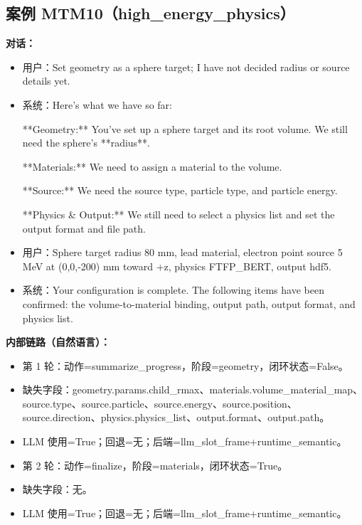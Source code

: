 \documentclass[11pt]{ctexart}
\begin{document}
\subsection{案例 MTM10（high\_energy\_physics）}
\textbf{对话：}
\begin{itemize}
\item 用户：Set geometry as a sphere target; I have not decided radius or source details yet.
\item 系统：Here's what we have so far:

**Geometry:** You've set up a sphere target and its root volume. We still need the sphere's **radius**.

**Materials:** We need to assign a material to the volume.

**Source:** We need the source type, particle type, and particle energy.

**Physics \& Output:** We still need to select a physics list and set the output format and file path.
\item 用户：Sphere target radius 80 mm, lead material, electron point source 5 MeV at (0,0,-200) mm toward +z, physics FTFP\_BERT, output hdf5.
\item 系统：Your configuration is complete. The following items have been confirmed: the volume-to-material binding, output path, output format, and physics list.
\end{itemize}
\textbf{内部链路（自然语言）：}
\begin{itemize}
\item 第 1 轮：动作=summarize\_progress，阶段=geometry，闭环状态=False。
\item 缺失字段：geometry.params.child\_rmax、materials.volume\_material\_map、source.type、source.particle、source.energy、source.position、source.direction、physics.physics\_list、output.format、output.path。
\item LLM 使用=True；回退=无；后端=llm\_slot\_frame+runtime\_semantic。
\item 第 2 轮：动作=finalize，阶段=materials，闭环状态=True。
\item 缺失字段：无。
\item LLM 使用=True；回退=无；后端=llm\_slot\_frame+runtime\_semantic。
\end{itemize}
\end{document}
